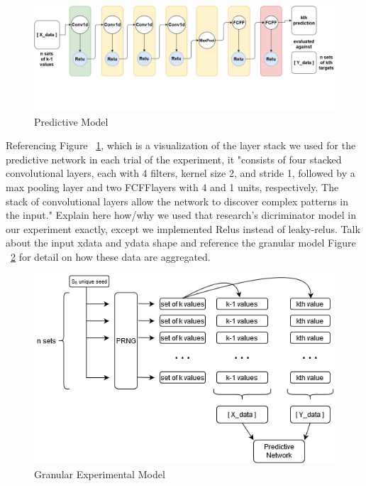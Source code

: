 \documentclass[conference]{IEEEtran}
\begin{document}
\begin{figure}[H]
\centering
\includegraphics[width=1\linewidth]{./Images/PredictiveModel.png}
\caption{Predictive Model}
\label{fig:Predictive Model}
\end{figure}

Referencing Figure ~\ref{fig:Predictive Model}, which is a visualization of the layer stack we used for the predictive network in each trial of the experiment, it "consists of four stacked convolutional layers, each with 4 filters, kernel size 2, and stride 1, followed by a max pooling layer and two FCFFlayers with 4 and 1 units, respectively. The stack of convolutional layers allow the network to discover complex patterns in the input." \cite{debernardi2018pseudo} Explain here how/why we used that research's dicriminator model in our experiment exactly, except we implemented Relus instead of leaky-relus. Talk about the input xdata and ydata shape and reference the granular model Figure ~\ref{fig:Granular Experimental Model} for detail on how these data are aggregated.



\begin{figure}[H]
\centering
\includegraphics[width=1\linewidth]{./Images/GranularModel.png}
\caption{Granular Experimental Model}
\label{fig:Granular Experimental Model}
\end{figure}
\end{document}
